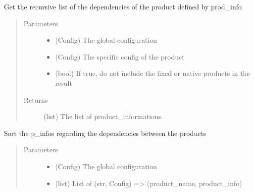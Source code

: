 \documentclass[a4paper,10pt,english]{sphinxmanual}
\begin{document}
\begin{fulllineitems}
\label{\detokenize{apidoc_commands/commands:commands.compile.get_recursive_fathers}}
Get the recursive list of the dependencies of the product defined 
by prod\_info
\begin{quote}\begin{description}
\item[{Parameters}] \leavevmode\begin{itemize}
\item {} 
 \textendash{} (Config) The global configuration

\item {} 
 \textendash{} (Config) The specific config of the product

\item {} 
 \textendash{} (bool) 
If true, do not include the fixed or native products in the result

\end{itemize}

\item[{Returns}] \leavevmode
(list) The list of product\_informations.

\end{description}\end{quote}

\end{fulllineitems}


\begin{fulllineitems}
\label{\detokenize{apidoc_commands/commands:commands.compile.sort_products}}
Sort the p\_infos regarding the dependencies between the products
\begin{quote}\begin{description}
\item[{Parameters}] \leavevmode\begin{itemize}
\item {} 
 \textendash{} (Config) The global configuration

\item {} 
 \textendash{} (list) 
List of (str, Config) =\textgreater{} (product\_name, product\_info)

\end{itemize}

\end{description}\end{quote}

\end{fulllineitems}
\end{document}
